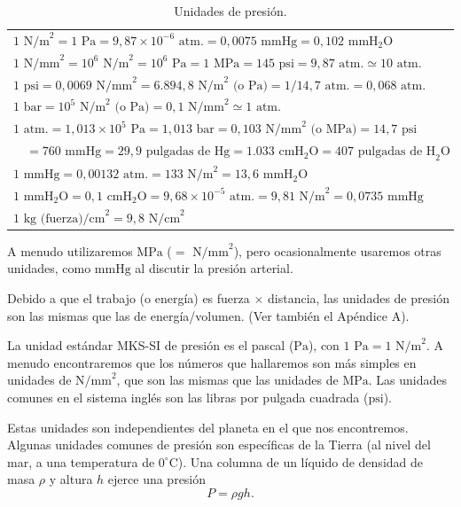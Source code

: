 \documentclass[12pt]{book}
\begin{document}
\begin{table}[htbp]
\centering
\caption{Unidades de presión.}
\label{tab:26}
\small
\begin{tabular}{l}
\toprule
$1\text{ N/m}^2 = 1\text{ Pa} = 9,87 \times 10^{-6}\text{ atm.} = 0,0075\text{ mmHg} = 0,102\text{ mmH}_2\text{O}$ \\
$1\text{ N/mm}^2 = 10^6\text{ N/m}^2 = 10^6\text{ Pa} = 1\text{ MPa} = 145\text{ psi} = 9,87\text{ atm.} \simeq 10\text{ atm.}$ \\
$1\text{ psi} = 0,0069\text{ N/mm}^2 = 6.894,8\text{ N/m}^2\text{ (o Pa)} = 1/14,7\text{ atm.} = 0,068\text{ atm.}$ \\
$1\text{ bar} = 10^5\text{ N/m}^2\text{ (o Pa)} = 0,1\text{ N/mm}^2 \simeq 1\text{ atm.}$ \\
$1\text{ atm.} = 1,013 \times 10^5\text{ Pa} = 1,013\text{ bar} = 0,103\text{ N/mm}^2\text{ (o MPa)} = 14,7\text{ psi}$ \\
$\quad = 760\text{ mmHg} = 29,9\text{ pulgadas de Hg} = 1.033\text{ cmH}_2\text{O} = 407\text{ pulgadas de H}_2\text{O}$ \\
$1\text{ mmHg} = 0,00132\text{ atm.} = 133\text{ N/m}^2 = 13,6\text{ mmH}_2\text{O}$ \\
$1\text{ mmH}_2\text{O} = 0,1\text{ cmH}_2\text{O} = 9,68 \times 10^{-5}\text{ atm.} = 9,81\text{ N/m}^2 = 0,0735\text{ mmHg}$ \\
$1\text{ kg (fuerza)/cm}^2 = 9,8\text{ N/cm}^2$ \\
\bottomrule
\end{tabular}
\end{table}

A menudo utilizaremos $\text{MPa}$ ($=\text{ N/mm}^2$), pero ocasionalmente usaremos otras unidades, como $\text{mmHg}$ al discutir la presión arterial.

Debido a que el trabajo (o energía) es fuerza $\times$ distancia, las unidades de presión son las mismas que las de energía/volumen. (Ver también el Apéndice A).

La unidad estándar MKS-SI de presión es el pascal ($\text{Pa}$), con $1\text{ Pa} = 1\text{ N/m}^2$. A menudo encontraremos que los números que hallaremos son más simples en unidades de $\text{N/mm}^2$, que son las mismas que las unidades de $\text{MPa}$. Las unidades comunes en el sistema inglés son las libras por pulgada cuadrada ($\text{psi}$).

Estas unidades son independientes del planeta en el que nos encontremos. Algunas unidades comunes de presión son específicas de la Tierra (al nivel del mar, a una temperatura de $0^\circ\text{C}$). Una columna de un líquido de densidad de masa $\rho$ y altura $h$ ejerce una presión
\begin{equation}
P = \rho g h.
\label{eq:2.48}
\end{equation}
\end{document}
